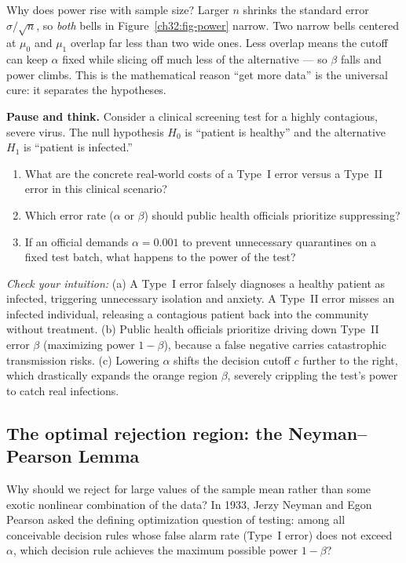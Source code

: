 \begin{whybox}
Why does power rise with sample size? Larger $n$ shrinks the standard error
$\sigma/\sqrt n$, so \emph{both} bells in Figure~\ref{ch32:fig-power} narrow. Two narrow
bells centered at $\mu_0$ and $\mu_1$ overlap far less than two wide ones. Less overlap
means the cutoff can keep $\alpha$ fixed while slicing off much less of the alternative
--- so $\beta$ falls and power climbs. This is the mathematical reason ``get more data''
is the universal cure: it separates the hypotheses.
\end{whybox}

\begin{recoverybox}
\textbf{Pause and think.} Consider a clinical screening test for a highly contagious, severe virus. The null hypothesis $H_0$ is ``patient is healthy'' and the alternative $H_1$ is ``patient is infected.''
\begin{enumerate}[label=(\alph*)]
  \item What are the concrete real-world costs of a Type~I error versus a Type~II error in this clinical scenario?
  \item Which error rate ($\alpha$ or $\beta$) should public health officials prioritize suppressing?
  \item If an official demands $\alpha = 0.001$ to prevent unnecessary quarantines on a fixed test batch, what happens to the power of the test?
\end{enumerate}
\textit{Check your intuition:}
(a) A Type~I error falsely diagnoses a healthy patient as infected, triggering unnecessary isolation and anxiety. A Type~II error misses an infected individual, releasing a contagious patient back into the community without treatment.
(b) Public health officials prioritize driving down Type~II error $\beta$ (maximizing power $1-\beta$), because a false negative carries catastrophic transmission risks.
(c) Lowering $\alpha$ shifts the decision cutoff $c$ further to the right, which drastically expands the orange region $\beta$, severely crippling the test's power to catch real infections.
\end{recoverybox}

\subsection{The optimal rejection region: the Neyman--Pearson Lemma}
\label{ch32:neyman-pearson}

Why should we reject for large values of the sample mean rather than some exotic nonlinear combination of the data? In 1933, Jerzy Neyman and Egon Pearson asked the defining optimization question of testing: among all conceivable decision rules whose false alarm rate (Type~I error) does not exceed $\alpha$, which decision rule achieves the maximum possible power $1-\beta$?

